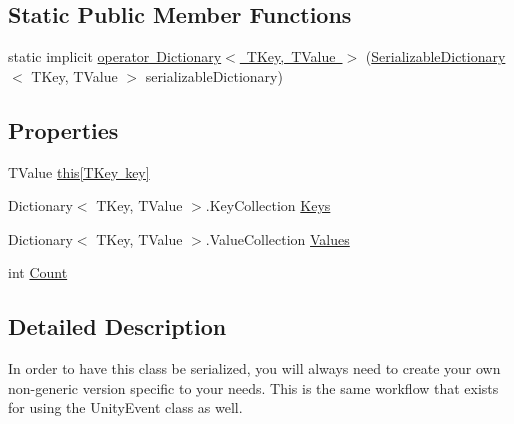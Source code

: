 \subsection*{Static Public Member Functions}
\begin{DoxyCompactItemize}
\item 
static implicit \mbox{\hyperlink{class_leap_1_1_unity_1_1_serializable_dictionary_aee53ce7d72c6a43a1c90e43c8a321272}{operator Dictionary$<$ T\+Key, T\+Value $>$}} (\mbox{\hyperlink{class_leap_1_1_unity_1_1_serializable_dictionary}{Serializable\+Dictionary}}$<$ T\+Key, T\+Value $>$ serializable\+Dictionary)
\end{DoxyCompactItemize}
\subsection*{Properties}
\begin{DoxyCompactItemize}
\item 
T\+Value \mbox{\hyperlink{class_leap_1_1_unity_1_1_serializable_dictionary_ad571fbbe0720c416b08eb11f7cda2386}{this\mbox{[}\+T\+Key key\mbox{]}}}
\item 
Dictionary$<$ T\+Key, T\+Value $>$.Key\+Collection \mbox{\hyperlink{class_leap_1_1_unity_1_1_serializable_dictionary_af69e275b3676874afb3018aa3b6297c1}{Keys}}
\item 
Dictionary$<$ T\+Key, T\+Value $>$.Value\+Collection \mbox{\hyperlink{class_leap_1_1_unity_1_1_serializable_dictionary_a2e69280a4555f8beaa81a567c55401ef}{Values}}
\item 
int \mbox{\hyperlink{class_leap_1_1_unity_1_1_serializable_dictionary_a929397d492ac8fb3ff01f3f0841f9193}{Count}}
\end{DoxyCompactItemize}


\subsection{Detailed Description}
In order to have this class be serialized, you will always need to create your own non-\/generic version specific to your needs. This is the same workflow that exists for using the Unity\+Event class as well. 



